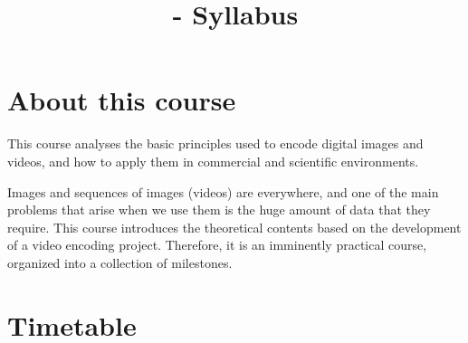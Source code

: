 
\title{\SM - Syllabus}

\maketitle

\section{About this course}

This course analyses the basic principles used to encode digital images
and videos, and how to apply them in commercial and scientific
environments.

Images and sequences of images (videos) are everywhere, and one of the
main problems that arise when we use them is the huge amount of data
that they require. This course introduces the theoretical contents
based on the development of a video encoding project. Therefore, it is
an imminently practical course, organized into a collection of
milestones.

\section{Timetable}

